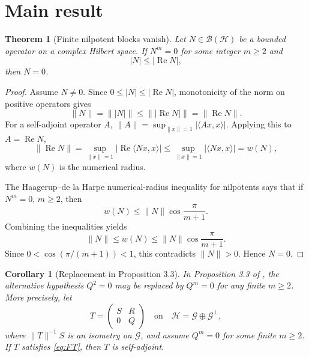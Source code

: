 \documentclass[11pt]{article}
\newtheorem{theorem}{Theorem}
\newtheorem{corollary}{Corollary}
\newcommand{\HH}{\mathcal H}
\newcommand{\BB}{\mathcal B}
\newcommand{\opRe}{\operatorname{Re}}
\begin{document}
\section*{Main result}

\begin{theorem}[Finite nilpotent blocks vanish]\label{thm:nilpotent}
Let \(N\in\BB(\HH)\) be a bounded operator on a complex Hilbert space. If
\(N^m=0\) for some integer \(m\geq 2\) and
\[
  |N|\leq |\opRe N|,
\]
then \(N=0\).
\end{theorem}

\begin{proof}
Assume \(N\neq 0\). Since \(0\leq |N|\leq |\opRe N|\), monotonicity of the norm
on positive operators gives
\[
  \|N\|=\||N|\|\leq \||\opRe N|\|=\|\opRe N\|.
\]
For a self-adjoint operator \(A\), \(\|A\|=\sup_{\|x\|=1}|\langle Ax,x\rangle|\).
Applying this to \(A=\opRe N\),
\[
  \|\opRe N\|
  = \sup_{\|x\|=1} |\operatorname{Re}\langle Nx,x\rangle|
  \leq \sup_{\|x\|=1} |\langle Nx,x\rangle|
  = w(N),
\]
where \(w(N)\) is the numerical radius.

The Haagerup--de la Harpe numerical-radius inequality for nilpotents
\cite{HaagerupDeLaHarpe} says that if \(N^m=0\), \(m\geq 2\), then
\[
  w(N)\leq \|N\|\cos\frac{\pi}{m+1}.
\]
Combining the inequalities yields
\[
  \|N\|\leq w(N)\leq \|N\|\cos\frac{\pi}{m+1}.
\]
Since \(0<\cos(\pi/(m+1))<1\), this contradicts \(\|N\|>0\). Hence \(N=0\).
\end{proof}

\begin{corollary}[Replacement in Proposition 3.3]\label{cor:prop33}
In Proposition 3.3 of \cite{MbekhtaSuciu}, the alternative hypothesis
\(Q^2=0\) may be replaced by \(Q^m=0\) for any finite \(m\geq 2\). More
precisely, let
\[
  T=\begin{pmatrix} S&R\\0&Q\end{pmatrix}
  \quad\text{on}\quad \HH=\mathcal G\oplus\mathcal G^\perp,
\]
where \(\|T\|^{-1}S\) is an isometry on \(\mathcal G\), and assume
\(Q^m=0\) for some finite \(m\geq 2\). If \(T\) satisfies \eqref{eq:FT}, then
\(T\) is self-adjoint.
\end{corollary}
\end{document}
